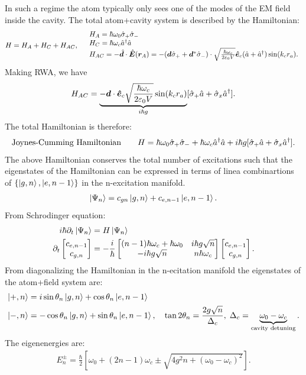 In such a regime the atom typically only sees one of the modes of the EM field inside the cavity. 
The total atom+cavity system is described by the Hamiltonian:
\begin{align*}
    H=H_A+H_C+H_{AC},\quad\begin{array}{l}
        H_A=\hbar\omega_0\hat{\sigma}_+\hat{\sigma}_-\\
        H_C=\hbar\omega_c\hat{a}^\dagger\hat{a}\\
        H_{AC}=-\hat{\bm{d}}\cdot\hat{\bm{E}}(\bm{r}_A)=-(\bm{d}\hat{\sigma}_++\bm{d}^*\hat{\sigma}_-)\cdot\sqrt{\frac{\hbar\omega_c}{2\varepsilon_0V}}\bm{\hat{e}}_c(\hat{a}+\hat{a}^\dagger)\sin(k_cr_a).
    \end{array}
\end{align*}
Making RWA, we have 
\begin{align*}
    H_{AC}=\underbrace{-\bm{d}\cdot\bm{\hat{e}}_c\sqrt{\frac{\hbar\omega_c}{2\varepsilon_0V}}\sin(k_cr_a)}_{i\hbar g}[\hat{\sigma}_+\hat{a}+\hat{\sigma}_x\hat{a}^\dagger].
\end{align*}
The total Hamiltonian is therefore:
\begin{align}
    \text{Joynes-Cumming Hamiltonian}\qquad H=\hbar\omega_0\hat{\sigma}_+\hat{\sigma}_-+\hbar\omega_c\hat{a}^\dagger\hat{a}+i\hbar g[\hat{\sigma}_+\hat{a}+\hat{\sigma}_x\hat{a}^\dagger].
\end{align}
The above Hamiltonian conserves the total number of excitations such that the eigenstates of the Hamiltonian can be expressed 
in terms of linea combinartions of $\{\left|g,n\right\rangle,\left|e,n-1\right\rangle\}$ in the n-excitation manifold.
\begin{align*}
    \left|\Psi_n\right\rangle=c_{gn}\left|g,n\right\rangle+c_{e,n-1}\left|e,n-1\right\rangle.
\end{align*}
From Schrodinger equation:
\begin{align*}
    i\hbar\partial_t\left|\Psi_n\right\rangle&=H\left|\Psi_n\right\rangle\\
    \partial_t\begin{bmatrix}
        c_{e,n-1}\\c_{g,n}
    \end{bmatrix}&=-\frac{i}{\hbar}\begin{bmatrix}
        (n-1)\hbar\omega_c+\hbar\omega_0&i\hbar g\sqrt{n}\\
        -i\hbar g\sqrt{n}&n\hbar\omega_c
    \end{bmatrix}
    \begin{bmatrix}
        c_{e,n-1}\\c_{g,n}
    \end{bmatrix}.
\end{align*}
From diagonalizing the Hamiltonian in the n-ecitation manifold the eigenstates of the atom+field system are:
\begin{align*}
    \left|+,n\right\rangle&=i\sin\theta_n\left|g,n\right\rangle+\cos\theta_n\left|e,n-1\right\rangle\\
    \left|-,n\right\rangle&=-\cos\theta_n\left|g,n\right\rangle+\sin\theta_n\left|e,n-1\right\rangle,\quad\tan2\theta_n=\frac{2g\sqrt{n}}{\Delta_c},\;\Delta_c=\underbrace{\omega_0-\omega_c}_{\text{cavity detuning}}.
\end{align*}
The eigenenergies are:
\begin{align*}
    E_n^\pm=\frac{\hbar}{2}\left[\omega_0+(2n-1)\omega_c\pm\sqrt{4g^2n+(\omega_0-\omega_c)^2}\right].
\end{align*}

